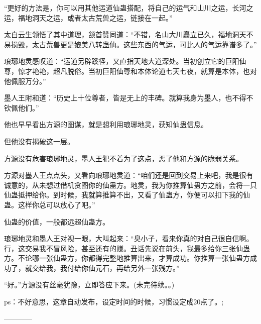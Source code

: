 \begin{this_body}
“更好的方法是，你可以用其他运道仙蛊搭配，将自己的运气和山川之运，长河之运，福地洞天之运，或者太古荒兽之运，链接在一起。”

太白云生领悟了其中道理，颔首赞同道：“不错，名山大川矗立已久，福地洞天不易损毁，太古荒兽更是媲美八转蛊仙。这些东西的气运，可比人的气运靠谱多了。”

琅琊地灵感叹道：“运道另辟蹊径，又直指天地大道深处。当初创立它的巨阳仙尊，惊才艳艳，超凡脱俗。当初巨阳仙尊和本体论道七天七夜，就算是本体，也对他佩服万分。”

墨人王附和道：“历史上十位尊者，皆是无上的丰碑。就算我身为墨人，也不得不钦佩他们。”

他也早早看出方源的图谋，就是想利用琅琊地灵，获知仙蛊信息。

但他没有揭破这一层。

方源没有危害琅琊地灵，墨人王犯不着为了这点，恶了他和方源的脆弱关系。

方源对墨人王点点头，又看向琅琊地灵道：“咱们还是回到交易上来吧，我是很有诚意的，从未想过借机贪图你的仙蛊方。地灵，我为你推算仙蛊方之前，会将一只仙蛊抵押给你。到时候，我就算推算不出，又看了仙蛊方，你便可以扣下我的仙蛊。这样你总可以放心了吧。”

仙蛊的价值，一般都远超仙蛊方。

琅琊地灵和墨人王对视一眼，大叫起来：“臭小子，看来你真的对自己很自信啊。行，这交易我不冒风险，甚至还有的赚。丑话先说在前头，我最多给你三张仙蛊方。不论哪一张仙蛊方，你都得完整地推算出来，才算成功。你推算一张仙蛊方成功了，就交给我，我付给你仙元石，再给另外一张残方。”

“好。”方源没有丝毫犹豫，立即答应下来。(未完待续。。)

ps：不好意思，这章自动发布，设定时间的时候，习惯设定成20点了。;

------------

\end{this_body}

